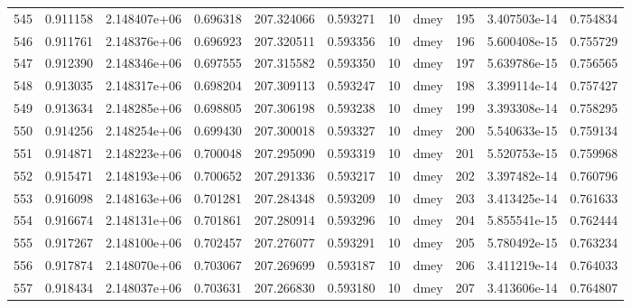 \begin{tabular}{lrrrrrrlrrr}
545  &    0.911158 &        2.148407e+06 &  0.696318 &              207.324066 &    0.593271 &      10 &         dmey &    195 &   3.407503e-14 &      0.754834 \\
546  &    0.911761 &        2.148376e+06 &  0.696923 &              207.320511 &    0.593356 &      10 &         dmey &    196 &   5.600408e-15 &      0.755729 \\
547  &    0.912390 &        2.148346e+06 &  0.697555 &              207.315582 &    0.593350 &      10 &         dmey &    197 &   5.639786e-15 &      0.756565 \\
548  &    0.913035 &        2.148317e+06 &  0.698204 &              207.309113 &    0.593247 &      10 &         dmey &    198 &   3.399114e-14 &      0.757427 \\
549  &    0.913634 &        2.148285e+06 &  0.698805 &              207.306198 &    0.593238 &      10 &         dmey &    199 &   3.393308e-14 &      0.758295 \\
550  &    0.914256 &        2.148254e+06 &  0.699430 &              207.300018 &    0.593327 &      10 &         dmey &    200 &   5.540633e-15 &      0.759134 \\
551  &    0.914871 &        2.148223e+06 &  0.700048 &              207.295090 &    0.593319 &      10 &         dmey &    201 &   5.520753e-15 &      0.759968 \\
552  &    0.915471 &        2.148193e+06 &  0.700652 &              207.291336 &    0.593217 &      10 &         dmey &    202 &   3.397482e-14 &      0.760796 \\
553  &    0.916098 &        2.148163e+06 &  0.701281 &              207.284348 &    0.593209 &      10 &         dmey &    203 &   3.413425e-14 &      0.761633 \\
554  &    0.916674 &        2.148131e+06 &  0.701861 &              207.280914 &    0.593296 &      10 &         dmey &    204 &   5.855541e-15 &      0.762444 \\
555  &    0.917267 &        2.148100e+06 &  0.702457 &              207.276077 &    0.593291 &      10 &         dmey &    205 &   5.780492e-15 &      0.763234 \\
556  &    0.917874 &        2.148070e+06 &  0.703067 &              207.269699 &    0.593187 &      10 &         dmey &    206 &   3.411219e-14 &      0.764033 \\
557  &    0.918434 &        2.148037e+06 &  0.703631 &              207.266830 &    0.593180 &      10 &         dmey &    207 &   3.413606e-14 &      0.764807 \\

\end{tabular}
